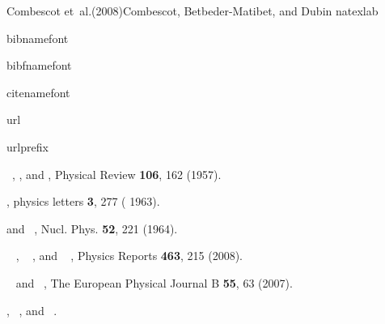 \documentclass[aps,prb,superscriptaddress,twocolumn]{revtex4}
\begin{document}
\begin{thebibliography}{Combescot et~al.(2008)Combescot, Betbeder-Matibet,
and Dubin}
\bibitem{} \expandafter\ifx\csname natexlab\endcsname\relax

\fi
\expandafter\ifx\csname bibnamefont\endcsname\relax

\fi
\expandafter\ifx\csname bibfnamefont\endcsname\relax

\fi
\expandafter\ifx\csname citenamefont\endcsname\relax

\fi
\expandafter\ifx\csname url\endcsname\relax

\fi
\expandafter\ifx\csname urlprefix\endcsname\relax

\fi
\providecommand{\bibinfo}[2]{#2} \providecommand{\eprint}[2][]{\url{#2}}

\bibinfo{author}{~},  %
\bibinfo{author}{ },  and 
\bibinfo{author}{
  }, \bibinfo{journal}{Physical Review}  \textbf{%
\bibinfo{volume}{106}}, \bibinfo{pages}{162} (\bibinfo{year}{1957}).

 \bibinfo{author}{%
 },  \bibinfo{journal}{physics
letters} \textbf{\bibinfo{volume}{3}},  \bibinfo{pages}{277} (%
\bibinfo{year}{1963}).

 \bibinfo{author}{%
 }  and \bibinfo{author}{%
~},  \bibinfo{journal}{Nucl. Phys.} 
\textbf{\bibinfo{volume}{52}},  \bibinfo{pages}{221} (\bibinfo{year}{1964}).

 \bibinfo{author}{~%
},  \bibinfo{author}{~%
},  and \bibinfo{author}{~%
},  \bibinfo{journal}{Physics Reports} \textbf{%
\bibinfo{volume}{463}},  \bibinfo{pages}{215} (\bibinfo{year}{2008}).

\bibinfo{author}{~} and  %
\bibinfo{author}{~},  %
\bibinfo{journal}{The European Physical Journal B}  \textbf{%
\bibinfo{volume}{55}}, \bibinfo{pages}{63} (\bibinfo{year}{2007}).

\bibinfo{author}{ }, %
\bibinfo{author}{~}, and %
\bibinfo{author}{\bibfnamefont{M.}~}.
\end{thebibliography}
\end{document}
